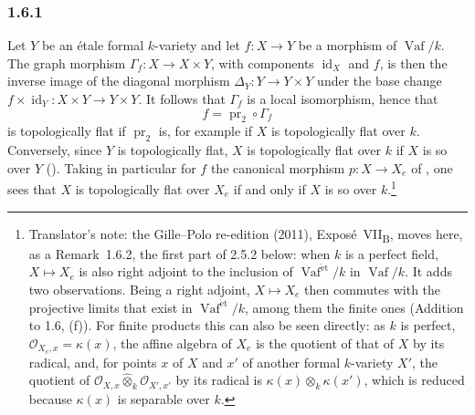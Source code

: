 
\subsubsection*{1.6.1}
\label{sga3:VIIB:1.6.1}

Let \(Y\) be an étale formal \(k\)-variety and let
\(f:X\to Y\) be a morphism of \(\operatorname{Vaf}/k\). The graph
morphism \(\Gamma_f:X\to X\times Y\), with components
\(\operatorname{id}_X\) and \(f\), is then the inverse image of the
diagonal morphism \(\Delta_Y:Y\to Y\times Y\) under the base change
\(f\times\operatorname{id}_Y:X\times Y\to Y\times Y\). It follows that
\(\Gamma_f\) is a local isomorphism, hence that
\[
  f=\operatorname{pr}_2\circ\Gamma_f
\]
is topologically flat if \(\operatorname{pr}_2\) is, for example if
\(X\) is topologically flat over \(k\). Conversely, since \(Y\) is
topologically flat, \(X\) is topologically flat over \(k\) if \(X\) is
so over \(Y\) \textup{()}. Taking in particular for \(f\) the
canonical morphism \(p:X\to X_e\) of , one sees that \(X\) is
topologically flat over \(X_e\) if and only if \(X\) is so over \(k\).\footnote{Translator's note: the Gille--Polo re-edition (2011),
Exposé~VII\textsubscript{B}, moves here, as a Remark~1.6.2, the first part of
2.5.2 below: when \(k\) is a perfect field, \(X\mapsto X_e\) is also right
adjoint to the inclusion of \(\operatorname{Vaf}^{\mathrm{\acute{e}t}}/k\) in
\(\operatorname{Vaf}/k\). It adds two observations. Being a right adjoint,
\(X\mapsto X_e\) then commutes with the projective limits that exist in
\(\operatorname{Vaf}^{\mathrm{\acute{e}t}}/k\), among them the finite ones
\textup{(Addition to 1.6, (f))}. For finite products this can also be seen
directly: as \(k\) is perfect, \(\mathcal O_{X_e,x}=\kappa(x)\), the affine
algebra of \(X_e\) is the quotient of that of \(X\) by its radical, and, for
points \(x\) of \(X\) and \(x'\) of another formal \(k\)-variety \(X'\), the
quotient of \(\mathcal O_{X,x}\widehat\otimes_k\mathcal O_{X',x'}\) by its
radical is \(\kappa(x)\otimes_k\kappa(x')\), which is reduced because
\(\kappa(x)\) is separable over \(k\).}

